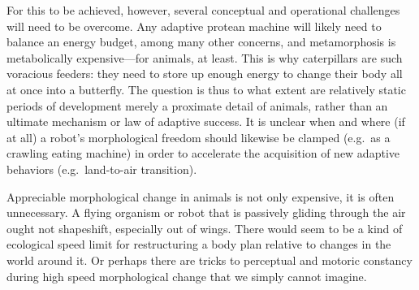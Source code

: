 
For this to be achieved, however, several conceptual and operational challenges will need to be overcome. 
Any adaptive protean machine will
likely
need to balance an energy budget,
among many other concerns,
and metamorphosis is metabolically expensive---for animals, at least.
This is why caterpillars are such
voracious feeders:
they need to store up enough energy to change their body all at once into a butterfly.
The question is thus to what extent are relatively static periods of development 
merely a proximate detail of animals,
rather than an ultimate mechanism \cite{tinbergen1963aims} or law of adaptive success.
It is unclear
when and where (if at all) a robot's morphological freedom should likewise be clamped (e.g.~as a crawling 
eating machine) in order to accelerate the acquisition of new adaptive behaviors (e.g.~land-to-air transition).

Appreciable 
morphological
change
in animals
is not only expensive, it is often unnecessary.
A flying organism or robot that is passively gliding through the air
ought not shapeshift, especially out of wings.
There would seem to be a kind of ecological speed limit for restructuring a body plan relative to changes in the world around it.
Or perhaps there are tricks to perceptual and motoric constancy during high speed morphological change that we simply cannot imagine.




